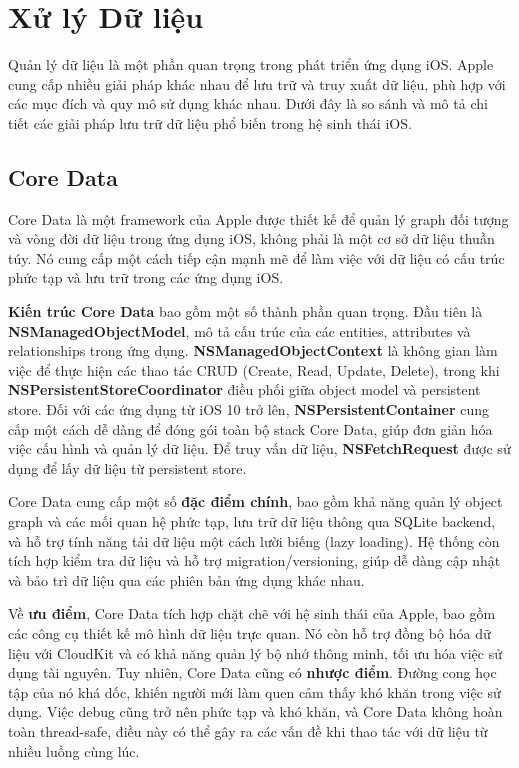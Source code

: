 \section{Xử lý Dữ liệu}

Quản lý dữ liệu là một phần quan trọng trong phát triển ứng dụng iOS. Apple cung cấp nhiều giải pháp khác nhau để lưu trữ và truy xuất dữ liệu, phù hợp với các mục đích và quy mô sử dụng khác nhau. Dưới đây là so sánh và mô tả chi tiết các giải pháp lưu trữ dữ liệu phổ biến trong hệ sinh thái iOS.


\subsection{Core Data}
Core Data\cite{Core-Data} là một framework của Apple được thiết kế để quản lý graph đối tượng và vòng đời dữ liệu trong ứng dụng iOS, không phải là một cơ sở dữ liệu thuần túy. Nó cung cấp một cách tiếp cận mạnh mẽ để làm việc với dữ liệu có cấu trúc phức tạp và lưu trữ trong các ứng dụng iOS.

\textbf{Kiến trúc Core Data} bao gồm một số thành phần quan trọng. Đầu tiên là \textbf{NSManagedObjectModel}, mô tả cấu trúc của các entities, attributes và relationships trong ứng dụng. \textbf{NSManagedObjectContext} là không gian làm việc để thực hiện các thao tác CRUD (Create, Read, Update, Delete), trong khi \textbf{NSPersistentStoreCoordinator} điều phối giữa object model và persistent store. Đối với các ứng dụng từ iOS 10 trở lên, \textbf{NSPersistentContainer} cung cấp một cách dễ dàng để đóng gói toàn bộ stack Core Data, giúp đơn giản hóa việc cấu hình và quản lý dữ liệu. Để truy vấn dữ liệu, \textbf{NSFetchRequest} được sử dụng để lấy dữ liệu từ persistent store.

Core Data cung cấp một số \textbf{đặc điểm chính}, bao gồm khả năng quản lý object graph và các mối quan hệ phức tạp, lưu trữ dữ liệu thông qua SQLite backend, và hỗ trợ tính năng tải dữ liệu một cách lười biếng (lazy loading). Hệ thống còn tích hợp kiểm tra dữ liệu và hỗ trợ migration/versioning, giúp dễ dàng cập nhật và bảo trì dữ liệu qua các phiên bản ứng dụng khác nhau.

Về \textbf{ưu điểm}, Core Data tích hợp chặt chẽ với hệ sinh thái của Apple, bao gồm các công cụ thiết kế mô hình dữ liệu trực quan. Nó còn hỗ trợ đồng bộ hóa dữ liệu với CloudKit và có khả năng quản lý bộ nhớ thông minh, tối ưu hóa việc sử dụng tài nguyên.
Tuy nhiên, Core Data cũng có \textbf{nhược điểm}. Đường cong học tập của nó khá dốc, khiến người mới làm quen cảm thấy khó khăn trong việc sử dụng. Việc debug cũng trở nên phức tạp và khó khăn, và Core Data không hoàn toàn thread-safe, điều này có thể gây ra các vấn đề khi thao tác với dữ liệu từ nhiều luồng cùng lúc.

